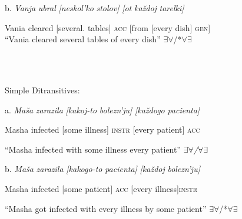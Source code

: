 \documentclass[output=paper,modfonts, nonflat]{langsci/langscibook}
\begin{document}
\begin{styleinnerExample}
b.  \textit{Vanja} \textit{ubral}   \textit{[neskol’ko} \textit{stolov]}      \textit{[ot}    \textit{každoj} \textit{tarelki]}
\end{styleinnerExample}

\begin{styleinnerExample}
  Vania cleared [several.     tables] \textsc{acc}  [from  [every  dish] \textsc{gen}]\\
“Vania cleared several tables of every dish” ${\exists}{\forall}$/*${\forall}{\exists}$
\end{styleinnerExample}

\ea%
    \label{ex:key:6}
    \gll\\
        \\
    \glt
    \z

         Simple Ditransitives:

\begin{styleinnerExample}
a.  \textit{Maša}   \textit{zarazila} \textit{[kakoj-to} \textit{bolezn’ju]}  \textit{[každogo} \textit{pacienta]}
\end{styleinnerExample}

\begin{styleinnerExample}
  Masha infected [some      illness] \textsc{instr}   [every     patient] \textsc{acc}
\end{styleinnerExample}

\begin{styleinnerExample}
  “Masha infected with some illness every patient” \textit{${\exists}{\forall}$/${\forall}{\exists}$}
\end{styleinnerExample}

\begin{styleinnerExample}
b.  \textit{Maša}   \textit{zarazila} \textit{[kakogo-to} \textit{pacienta]}   \textit{[každoj} \textit{bolezn’ju]}
\end{styleinnerExample}

\begin{styleinnerExample}
  Masha infected [some         patient] \textsc{acc}   [every  illness]\textsc{instr}
\end{styleinnerExample}

\begin{styleinnerExample}
  “Masha got infected with every illness by some patient” ${\exists}{\forall}$/*${\forall}{\exists}$
\end{styleinnerExample}

\ea%
    \label{ex:key:7}
    \gll\\
        \\
    \glt
    \z
\end{document}
